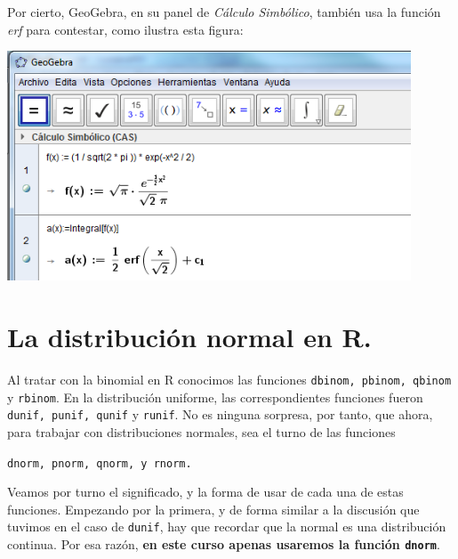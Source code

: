 \documentclass[10pt,a4paper]{article}\usepackage[]{graphicx}\usepackage[]{color}
\newcounter{cont01}
\begin{document}
Por cierto, GeoGebra, en su panel de {\em Cálculo Simbólico}, también usa la función {\em erf} para contestar, como ilustra esta figura:
\begin{center}
\includegraphics[width=12cm]{../fig/Tut05-66.png}
\end{center}

\section{La distribución normal en R.}
\label{tut05:subsec:DistribucionNormalR}

Al tratar con la binomial en R conocimos las funciones {\tt dbinom, pbinom, qbinom} y {\tt rbinom}. En la distribución uniforme, las correspondientes funciones fueron {\tt dunif, punif, qunif} y {\tt runif}. No es ninguna sorpresa, por tanto, que ahora, para trabajar con distribuciones normales, sea el turno de las funciones
    \begin{center}
    {\tt dnorm, \qquad     pnorm,     \qquad qnorm,  \qquad  y rnorm.}
    \end{center}
Veamos por turno el significado, y la forma de usar de cada una de estas funciones. Empezando por la primera, y de forma similar a la discusión que tuvimos en el caso de {\tt dunif}, hay que recordar que la normal es una distribución continua. Por esa razón, {\bf en este curso apenas usaremos la función {\tt dnorm}}.
\end{document}
